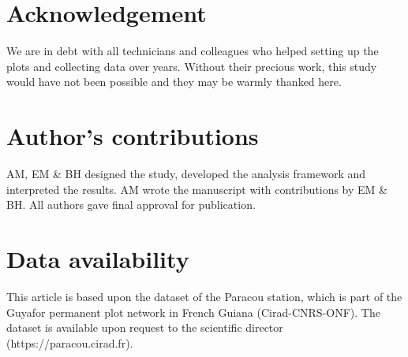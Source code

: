\documentclass[fleqn,10pt]{ArtEcoFoG} %
\begin{document}
\section{Acknowledgement}\label{acknowledgement}

We are in debt with all technicians and colleagues who helped setting up
the plots and collecting data over years. Without their precious work,
this study would have not been possible and they may be warmly thanked
here.

\section{Author's contributions}\label{authors-contributions}

AM, EM \& BH designed the study, developed the analysis framework and
interpreted the results. AM wrote the manuscript with contributions by
EM \& BH. All authors gave final approval for publication.

\section{Data availability}\label{data-availability}

This article is based upon the dataset of the Paracou station, which is
part of the Guyafor permanent plot network in French Guiana
(Cirad-CNRS-ONF). The dataset is available upon request to the
scientific director (https://paracou.cirad.fr).



\makeatletter

\makeatother


\end{document}
